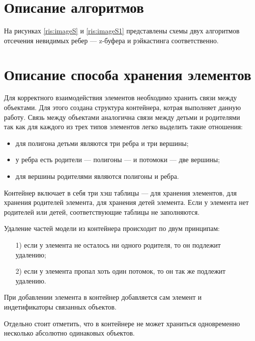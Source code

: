 \section{Описание алгоритмов}
На рисунках \ref{ris:imageS} и \ref{ris:imageS1} представлены схемы двух алгоритмов отсечения невидимых ребер --- z-буфера и рэйкастинга соответственно. 
\begin{center}
\centering
\def\svgwidth{7cm}

\label{ris:imageS}

\newpage

\def\svgwidth{15cm}

\label{ris:imageS1}
\end{center}

\section{Описание способа хранения элементов}
Для корректного взаимодействия элементов необходимо хранить связи между объектами. Для этого создана структура контейнера, котрая выполняет данную работу. Связь между объектами аналогична связи между детьми и родителями так как для каждого из трех типов элементов легко выделить такие отношения: 
\begin{itemize}
	\item для полигона детьми являются три ребра и три вершины;
	\item у ребра есть родители --- полигоны --- и потомоки --- две вершины;
	\item для вершины родителями являются полигоны и ребра.
\end{itemize}  
Контейнер включает в себя три хэш таблицы --- для хранения элементов, для хранения родителей элемента, для хранения детей элемента. Если у элемента нет родителей или детей, соответствующие таблицы не заполняются. 

Удаление частей модели из контейнера происходит по двум принципам:
\begin{enumerate}
	\item[1)] если у элемента не осталось ни одного родителя, то он подлежит удалению;
	\item[2)] если у элемента пропал хоть один потомок, то он так же подлежит удалению. 
\end{enumerate}  
При добавлении элемента в контейнер добавляется сам элемент и индетификаторы связанных объектов.

Отдельно стоит отметить, что в контейнере не может храниться одновременно несколько абсолютно одинаковых объектов. 